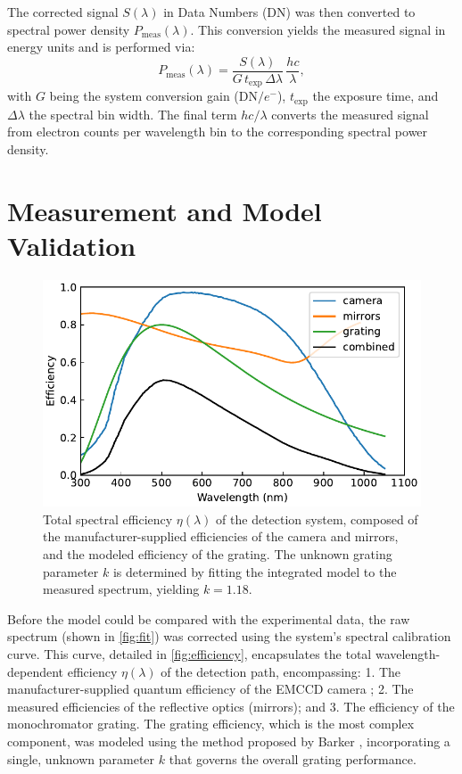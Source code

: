 \documentclass[
	a4paper,
]{scrarticle}
\begin{document}
The corrected signal $S(\lambda)$ in Data Numbers ($\text{DN}$) was then converted to spectral power density $P_{\text{meas}}(\lambda)$. This conversion yields the measured signal in energy units and is performed via:
\begin{equation}
  P_{\text{meas}}(\lambda)
  = \frac{S(\lambda)}{G\,t_{\text{exp}}\,\Delta\lambda}\,\frac{hc}{\lambda},
\end{equation}
with $G$ being the system conversion gain ($\text{DN}/e^-$), $t_{\text{exp}}$ the exposure time, and $\Delta\lambda$ the spectral bin width. The final term $hc /\lambda$ converts the measured signal from electron counts per wavelength bin to the corresponding spectral power density.

\clearpage
\section{Measurement and Model Validation}

\begin{figure}[h]
    \centering
    \includegraphics{../analysis/figures/combined.efficiency.pdf}
    \caption{Total spectral efficiency $\eta(\lambda)$ of the detection system, composed of the manufacturer-supplied efficiencies of the camera and mirrors, and the modeled efficiency of the grating. The unknown grating parameter $k$ is determined by fitting the integrated model to the measured spectrum, yielding $k=1.18$.}
    \label{fig:efficiency}
\end{figure}

Before the model could be compared with the experimental data, the raw spectrum (shown in \autoref{fig:fit}) was corrected using the system's spectral calibration curve. This curve, detailed in \autoref{fig:efficiency}, encapsulates the total wavelength-dependent efficiency $\eta(\lambda)$ of the detection path, encompassing: 1. The manufacturer-supplied quantum efficiency of the EMCCD camera \cite{andorIXonEM897Manual}; 2. The measured efficiencies of the reflective optics (mirrors); and 3. The efficiency of the monochromator grating. The grating efficiency, which is the most complex component, was modeled using the method proposed by Barker \cite{barkerRippleCorrectionHighdispersion1984}, incorporating a single, unknown parameter $k$ that governs the overall grating performance.
\end{document}
